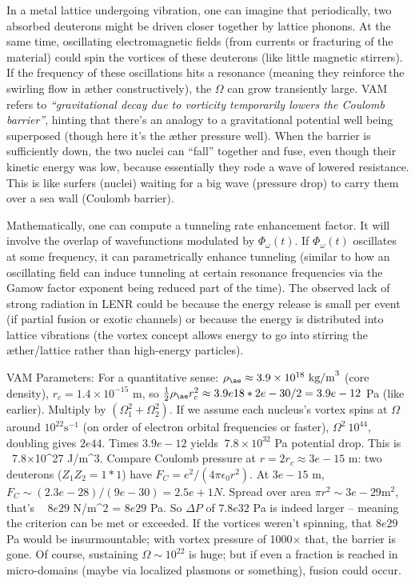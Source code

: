 \documentclass[a4paper, aps,preprint,superscriptaddress, 12pt]{revtex4}
\begin{document}
In a metal lattice undergoing vibration, one can imagine that periodically, two absorbed deuterons might be driven closer together by lattice phonons. At the same time, oscillating electromagnetic fields (from currents or fracturing of the material) could spin the vortices of these deuterons (like little magnetic stirrers). If the frequency of these oscillations hits a resonance (meaning they reinforce the swirling flow in æther constructively), the $\Omega$ can grow transiently large. VAM refers to \textit{“gravitational decay due to vorticity temporarily lowers the Coulomb barrier”}, hinting that there’s an analogy to a gravitational potential well being superposed (though here it’s the æther pressure well). When the barrier is sufficiently down, the two nuclei can “fall” together and fuse, even though their kinetic energy was low, because essentially they rode a wave of lowered resistance. This is like surfers (nuclei) waiting for a big wave (pressure drop) to carry them over a sea wall (Coulomb barrier).


Mathematically, one can compute a tunneling rate enhancement factor. It will involve the overlap of wavefunctions modulated by $\Phi_\omega(t)$. If $\Phi_\omega(t)$ oscillates at some frequency, it can parametrically enhance tunneling (similar to how an oscillating field can induce tunneling at certain resonance frequencies via the Gamow factor exponent being reduced part of the time). The observed lack of strong radiation in LENR could be because the energy release is small per event (if partial fusion or exotic channels) or because the energy is distributed into lattice vibrations (the vortex concept allows energy to go into stirring the æther/lattice rather than high-energy particles).


VAM Parameters: For a quantitative sense: $\rho_{\ae}\approx3.9\times10^{18}~\text{kg/m}^3$ (core density), $r_c=1.4\times10^{-15}$ m, so $\frac{1}{2}\rho_{\ae}r_c^2 \approx 3.9e18 * 2e-30 /2 = 3.9e-12$ Pa (like earlier). Multiply by $(\Omega_1^2+\Omega_2^2)$. If we assume each nucleus’s vortex spins at $\Omega$ around $10^{22}\text{s}^{-1}$ (on order of electron orbital frequencies or faster), $\Omega^2 ~ 10^{44}$, doubling gives $2e44$. Times $3.9e-12$ yields $~7.8\times10^{32}$ Pa potential drop. This is ~7.8×10^27 J/m^3. Compare Coulomb pressure at $r=2r_c \approx3e-15$ m: two deuterons ($Z_1Z_2=1*1$) have $F_C = e^2/(4\pi\epsilon_0 r^2)$. At $3e-15$ m, $F_C\sim (2.3e-28)/ (9e-30) =2.5e+1 N$. Spread over area $\pi r^2 \sim 3e-29 \text{m}^2$, that’s ~ $8e29$ N/m^2 = $8e29$ Pa. So $\Delta P$ of $7.8e32$ Pa is indeed larger – meaning the criterion can be met or exceeded. If the vortices weren’t spinning, that $8e29$ Pa would be insurmountable; with vortex pressure of 1000× that, the barrier is gone. Of course, sustaining $\Omega \sim10^{22}$ is huge; but if even a fraction is reached in micro-domains (maybe via localized plasmons or something), fusion could occur.
\end{document}
